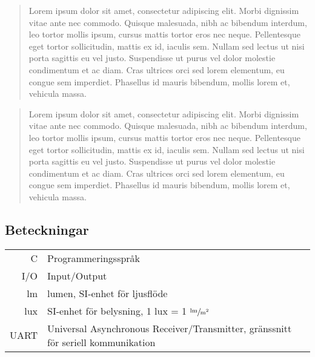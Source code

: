 \begin{abstract}
    Lorem ipsum dolor sit amet, consectetur adipiscing elit. Morbi dignissim vitae ante nec commodo. Quisque malesuada, nibh ac bibendum interdum, leo tortor mollis ipsum, cursus mattis tortor eros nec neque. Pellentesque eget tortor sollicitudin, mattis ex id, iaculis sem. Nullam sed lectus ut nisi porta sagittis eu vel justo. Suspendisse ut purus vel dolor molestie condimentum et ac diam. Cras ultrices orci sed lorem elementum, eu congue sem imperdiet. Phasellus id mauris bibendum, mollis lorem et, vehicula massa.
\end{abstract}

\renewcommand{\abstractname}{Abstract}
\begin{abstract}
    Lorem ipsum dolor sit amet, consectetur adipiscing elit. Morbi dignissim vitae ante nec commodo. Quisque malesuada, nibh ac bibendum interdum, leo tortor mollis ipsum, cursus mattis tortor eros nec neque. Pellentesque eget tortor sollicitudin, mattis ex id, iaculis sem. Nullam sed lectus ut nisi porta sagittis eu vel justo. Suspendisse ut purus vel dolor molestie condimentum et ac diam. Cras ultrices orci sed lorem elementum, eu congue sem imperdiet. Phasellus id mauris bibendum, mollis lorem et, vehicula massa. 
\end{abstract}

\newpage

\subsection*{Beteckningar} %
\label{sub:beteckningar}
    \begin{tabularx}{\textwidth}{@{}rX}
        C & Programmeringsspråk \\
        I/O & Input/Output \\
        lm & lumen, SI-enhet för ljusflöde \\
        lux & SI-enhet för belysning, 1 lux = 1 $\sfrac{\text{lm}}{\text{m}^2}$ \\
        UART & Universal Asynchronous Receiver/Transmitter, gränssnitt för seriell kommunikation
        
    \end{tabularx}
